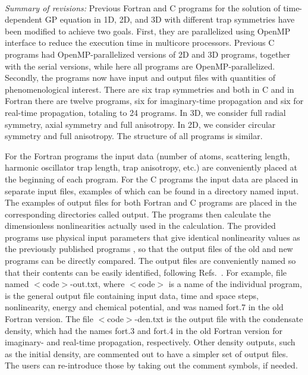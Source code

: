 \documentclass[onecolumn,3p]{elsarticle}
\begin{document}
\begin{small}
\noindent\\
{\em Summary of revisions:}
Previous Fortran \cite{bec2009} and C \cite{bec2012} programs for the solution of time-dependent GP equation in 1D, 2D, and 3D
with different trap symmetries have been modified to achieve two goals. First, they 
are parallelized using OpenMP interface to reduce the execution time in multicore processors.
Previous C programs \cite{bec2012} had OpenMP-parallelized versions of 2D and 3D programs, together with the serial versions, while here all programs are
OpenMP-parallelized. 
Secondly, the programs now have input and output files with quantities of phenomenological interest. 
There are six trap symmetries and both in C and in Fortran there are twelve programs, six for imaginary-time propagation and six for real-time propagation, totaling to 24 programs. 
In 3D, we consider full radial symmetry, axial symmetry and full anisotropy. In 2D, we consider circular symmetry and full anisotropy.
The structure of all programs is similar.

For the Fortran programs the input data (number of atoms, scattering length, harmonic oscillator trap length, trap anisotropy, etc.) are conveniently placed at the beginning of 
each program. For the C programs the input data are placed in separate input files, examples of which can be found in a directory named input.
The examples of output files for both Fortran and C programs are placed in the corresponding directories called output.
The programs then calculate the dimensionless nonlinearities actually used in the calculation. 
The provided programs use physical input parameters that give identical nonlinearity values as the
previously published programs \cite{bec2009,bec2012}, so that the output files of the old and new programs can be directly compared.
The output files are conveniently named so that their contents can be easily identified, following Refs.~\cite{dbec2015,dbec2016}.
For example, file named $<$code$>$-out.txt, where $<$code$>$ is a name of the individual program, is the general output file
containing input data, time and space steps, nonlinearity, energy and chemical potential, and was named fort.7 in the old Fortran version.
The file $<$code$>$-den.txt is the output file with the condensate density, which had the names fort.3 and fort.4 in the old Fortran version for imaginary- and
real-time propagation, respectively.
Other density outputs, such as the initial density, are commented out to have a simpler set of output files.
The users can re-introduce those by taking out the comment symbols, if needed.


\end{small}
\end{document}
